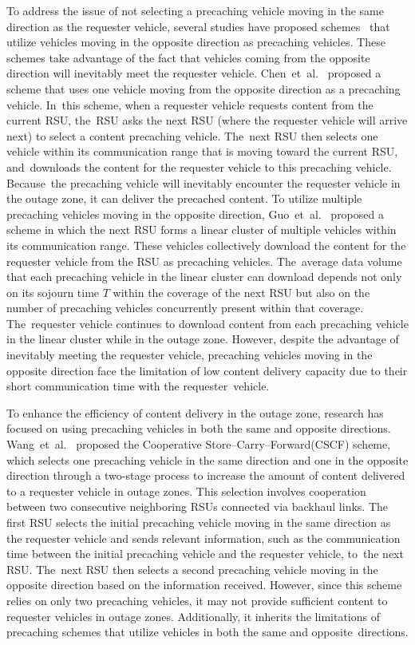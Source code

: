 \documentclass[electronics,aricle,accept,pdftex,moreauthors]{Definitions/mdpi}
\begin{document}
To address the issue of not selecting a precaching vehicle moving in the same direction as the requester vehicle, several studies have proposed schemes~\cite{Chen2009, Guo2017} that utilize vehicles moving in the opposite direction as precaching vehicles. These schemes take advantage of the fact that vehicles coming from the opposite direction will inevitably meet the requester vehicle.
Chen~et~al.~\cite{Chen2009} proposed a scheme that uses one vehicle moving from the opposite direction as a precaching vehicle. In~this scheme, when a requester vehicle requests content from the current RSU, the~RSU asks the next RSU (where the requester vehicle will arrive next) to select a content precaching vehicle. The~next RSU then selects one vehicle within its communication range that is moving toward the current RSU, and~downloads the content for the requester vehicle to this precaching vehicle. Because~the precaching vehicle will inevitably encounter the requester vehicle in the outage zone, it can deliver the precached content.
To utilize multiple precaching vehicles moving in the opposite direction, Guo~et~al.~\cite{Guo2017} proposed a scheme in which the next RSU forms a linear cluster of multiple vehicles within its communication range. These vehicles collectively download the content for the requester vehicle from the RSU as precaching vehicles. The~average data volume that each precaching vehicle in the linear cluster can download depends not only on its sojourn time $T$ within the coverage of the next RSU but also on the number of precaching vehicles concurrently present within that coverage. The~requester vehicle continues to download content from each precaching vehicle in the linear cluster while in the outage zone.
However, despite the advantage of inevitably meeting the requester vehicle, precaching vehicles moving in the opposite direction face the limitation of low content delivery capacity due to their short communication time with the requester~vehicle.

To enhance the efficiency of content delivery in the outage zone, research has focused on using precaching vehicles in both the same and opposite directions. Wang~et~al.~\cite{Wang2017} proposed the Cooperative Store--Carry--Forward(CSCF) scheme, which selects one precaching vehicle in the same direction and one in the opposite direction through a two-stage process to increase the amount of content delivered to a requester vehicle in outage zones. This selection involves cooperation between two consecutive neighboring RSUs connected via backhaul links.
The first RSU selects the initial precaching vehicle moving in the same direction as the requester vehicle and sends relevant information, such as the communication time between the initial precaching vehicle and the requester vehicle, to~the next RSU. The~next RSU then selects a second precaching vehicle moving in the opposite direction based on the information received.
However, since this scheme relies on only two precaching vehicles, it may not provide sufficient content to requester vehicles in outage zones. Additionally, it inherits the limitations of precaching schemes that utilize vehicles in both the same and opposite~directions.
\end{document}
